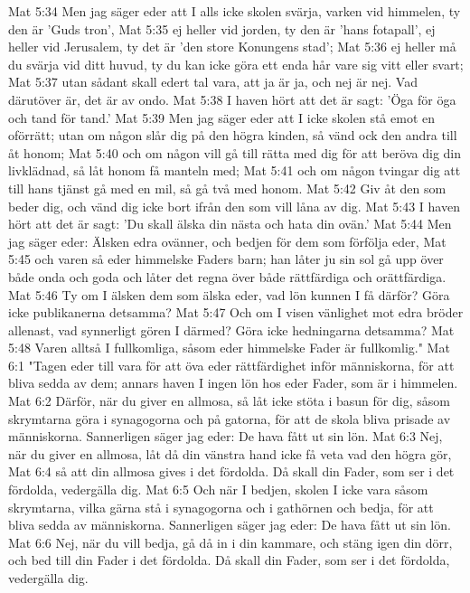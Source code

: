 Mat 5:34  Men jag säger eder att I alls icke skolen svärja, varken vid himmelen, ty den är 'Guds tron',
Mat 5:35  ej heller vid jorden, ty den är 'hans fotapall', ej heller vid Jerusalem, ty det är 'den store Konungens stad';
Mat 5:36  ej heller må du svärja vid ditt huvud, ty du kan icke göra ett enda hår vare sig vitt eller svart;
Mat 5:37  utan sådant skall edert tal vara, att ja är ja, och nej är nej. Vad därutöver är, det är av ondo.
Mat 5:38  I haven hört att det är sagt: 'Öga för öga och tand för tand.'
Mat 5:39  Men jag säger eder att I icke skolen stå emot en oförrätt; utan om någon slår dig på den högra kinden, så vänd ock den andra till åt honom;
Mat 5:40  och om någon vill gå till rätta med dig för att beröva dig din livklädnad, så låt honom få manteln med;
Mat 5:41  och om någon tvingar dig att till hans tjänst gå med en mil, så gå två med honom.
Mat 5:42  Giv åt den som beder dig, och vänd dig icke bort ifrån den som vill låna av dig.
Mat 5:43  I haven hört att det är sagt: 'Du skall älska din nästa och hata din ovän.'
Mat 5:44  Men jag säger eder: Älsken edra ovänner, och bedjen för dem som förfölja eder,
Mat 5:45  och varen så eder himmelske Faders barn; han låter ju sin sol gå upp över både onda och goda och låter det regna över både rättfärdiga och orättfärdiga.
Mat 5:46  Ty om I älsken dem som älska eder, vad lön kunnen I få därför? Göra icke publikanerna detsamma?
Mat 5:47  Och om I visen vänlighet mot edra bröder allenast, vad synnerligt gören I därmed? Göra icke hedningarna detsamma?
Mat 5:48  Varen alltså I fullkomliga, såsom eder himmelske Fader är fullkomlig."
Mat 6:1  "Tagen eder till vara för att öva eder rättfärdighet inför människorna, för att bliva sedda av dem; annars haven I ingen lön hos eder Fader, som är i himmelen.
Mat 6:2  Därför, när du giver en allmosa, så låt icke stöta i basun för dig, såsom skrymtarna göra i synagogorna och på gatorna, för att de skola bliva prisade av människorna. Sannerligen säger jag eder: De hava fått ut sin lön.
Mat 6:3  Nej, när du giver en allmosa, låt då din vänstra hand icke få veta vad den högra gör,
Mat 6:4  så att din allmosa gives i det fördolda. Då skall din Fader, som ser i det fördolda, vedergälla dig.
Mat 6:5  Och när I bedjen, skolen I icke vara såsom skrymtarna, vilka gärna stå i synagogorna och i gathörnen och bedja, för att bliva sedda av människorna. Sannerligen säger jag eder: De hava fått ut sin lön.
Mat 6:6  Nej, när du vill bedja, gå då in i din kammare, och stäng igen din dörr, och bed till din Fader i det fördolda. Då skall din Fader, som ser i det fördolda, vedergälla dig.

